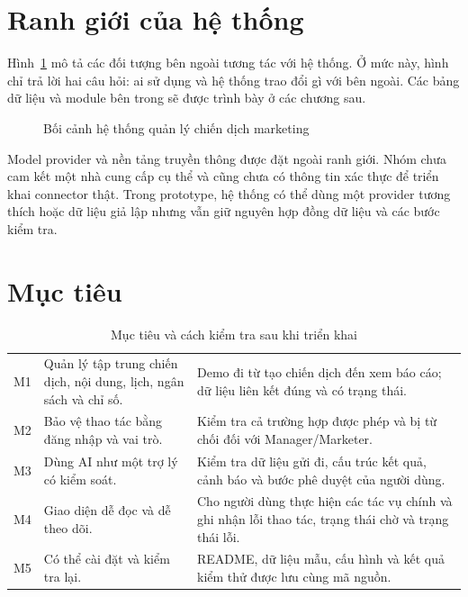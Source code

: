 \section{Ranh giới của hệ thống}

Hình~\ref{fig:v8-context} mô tả các đối tượng bên ngoài tương tác với hệ thống. Ở mức này, hình chỉ trả lời hai câu hỏi: ai sử dụng và hệ thống trao đổi gì với bên ngoài. Các bảng dữ liệu và module bên trong sẽ được trình bày ở các chương sau.

\begin{figure}[h!]
\centering

\caption{Bối cảnh hệ thống quản lý chiến dịch marketing}
\label{fig:v8-context}
\end{figure}

Model provider và nền tảng truyền thông được đặt ngoài ranh giới. Nhóm chưa cam kết một nhà cung cấp cụ thể và cũng chưa có thông tin xác thực để triển khai connector thật. Trong prototype, hệ thống có thể dùng một provider tương thích hoặc dữ liệu giả lập nhưng vẫn giữ nguyên hợp đồng dữ liệu và các bước kiểm tra.

\section{Mục tiêu}

\begin{table}[h!]
\centering
\small
\caption{Mục tiêu và cách kiểm tra sau khi triển khai}
\label{tab:v8-goals}
\begin{tabularx}{\textwidth}{|C{1.0cm}|L{4.2cm}|Y|}
\hline
{} &  & \\
\hline
M1 & Quản lý tập trung chiến dịch, nội dung, lịch, ngân sách và chỉ số. & Demo đi từ tạo chiến dịch đến xem báo cáo; dữ liệu liên kết đúng và có trạng thái.\\
\hline
M2 & Bảo vệ thao tác bằng đăng nhập và vai trò. & Kiểm tra cả trường hợp được phép và bị từ chối đối với Manager/Marketer.\\
\hline
M3 & Dùng AI như một trợ lý có kiểm soát. & Kiểm tra dữ liệu gửi đi, cấu trúc kết quả, cảnh báo và bước phê duyệt của người dùng.\\
\hline
M4 & Giao diện dễ đọc và dễ theo dõi. & Cho người dùng thực hiện các tác vụ chính và ghi nhận lỗi thao tác, trạng thái chờ và trạng thái lỗi.\\
\hline
M5 & Có thể cài đặt và kiểm tra lại. & README, dữ liệu mẫu, cấu hình và kết quả kiểm thử được lưu cùng mã nguồn.\\
\hline
\end{tabularx}
\end{table}

